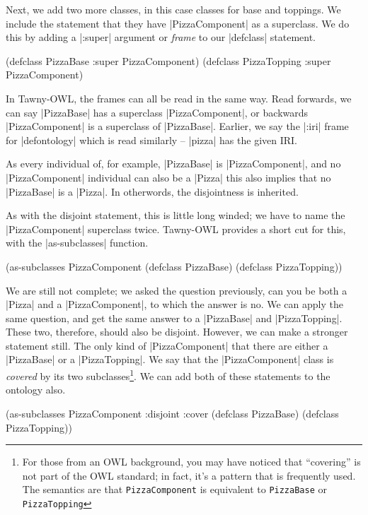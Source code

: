 Next, we add two more classes, in this case classes for base and
toppings. We include the statement that they have |PizzaComponent| as
a superclass. We do this by adding a |:super| argument or \emph{frame}
to our |defclass| statement.

\begin{tawnyexample}
(defclass PizzaBase
  :super PizzaComponent)
(defclass PizzaTopping
  :super PizzaComponent)
\end{tawnyexample}

In Tawny-OWL, the frames can all be read in the same way. Read
forwards, we can say |PizzaBase| has a superclass |PizzaComponent|, or
backwards |PizzaComponent| is a superclass of |PizzaBase|. Earlier, we
say the |:iri| frame for |defontology| which is read similarly --
|pizza| has the given IRI.

As every individual of, for example, |PizzaBase| is |PizzaComponent|, and no
|PizzaComponent| individual can also be a |Pizza| this also implies that no
|PizzaBase| is a |Pizza|. In otherwords, the disjointness is inherited.

As with the disjoint statement, this is little long winded; we have to name
the |PizzaComponent| superclass twice. Tawny-OWL provides a short cut for
this, with the |as-subclasses| function.

\begin{tawnyexample}
(as-subclasses
 PizzaComponent
 (defclass PizzaBase)
 (defclass PizzaTopping))
\end{tawnyexample}

We are still not complete; we asked the question previously, can you
be both a |Pizza| and a |PizzaComponent|, to which the answer is
no. We can apply the same question, and get the same answer to a
|PizzaBase| and |PizzaTopping|.  These two, therefore, should also be
disjoint. However, we can make a stronger statement still. The only
kind of |PizzaComponent| that there are either a |PizzaBase| or a
|PizzaTopping|. We say that the |PizzaComponent| class is
\emph{covered} by its two subclasses\footnote{For those from an OWL
  background, you may have noticed that ``covering'' is not part of
  the OWL standard; in fact, it's a pattern that is frequently
  used. The semantics are that \lstinline{PizzaComponent} is
  equivalent to \lstinline{PizzaBase} or \lstinline{PizzaTopping}}. We
can add both of these statements to the ontology also.

\begin{tawny}
(as-subclasses
 PizzaComponent
 :disjoint :cover
 (defclass PizzaBase)
 (defclass PizzaTopping))
\end{tawny}

